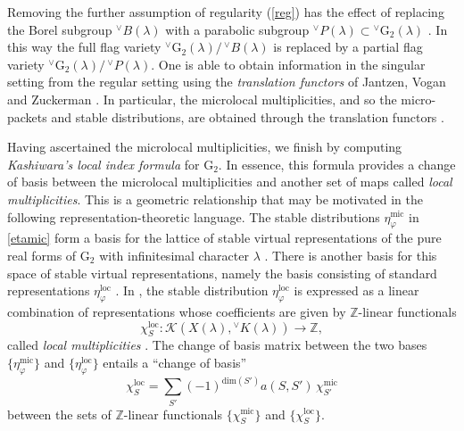 \documentclass[a4paper, 11pt]{article}
\begin{document}
Removing the further assumption of regularity (\ref{reg}) has the effect of
replacing the 
Borel subgroup ${^\vee}B(\lambda)$ with a parabolic subgroup
${^\vee}P(\lambda) \subset {^\vee}\mathrm{G}_{2}(\lambda)$
\cite[(6.2)(e), Proposition 6.16]{ABV}.   In this way the full flag
variety ${^\vee}\mathrm{G}_{2}(\lambda)/ \, {^\vee}B(\lambda)$ is
replaced by a partial flag variety ${^\vee}\mathrm{G}_{2}(\lambda)/ \,
{^\vee}P(\lambda)$.  One is able to obtain information in the singular
setting from the regular setting using the \emph{translation functors}
of Jantzen, Vogan and Zuckerman \cite[Propositions 8.8 and 16.6]{ABV}.
In particular, the microlocal multiplicities, and so the micro-packets
and stable distributions, are obtained through the translation functors
\cite[Proposition 20.1 (e)]{ABV}.  

Having ascertained the microlocal multiplicities,
we finish by computing  \emph{Kashiwara's local index formula} for
$\mathrm{G}_{2}$.  In essence, this formula provides a change of basis
between the microlocal multiplicities and another set of maps called
\emph{local multiplicities}.  This is a geometric relationship that may be
motivated in the following representation-theoretic language.
The stable distributions $\eta_{\varphi}^{\mathrm{mic}}$ in
\eqref{etamic} form a basis for the 
lattice of stable virtual representations  
of the pure real forms of $\mathrm{G}_2$ with infinitesimal
character $\lambda$ \cite[Corollary 19.16]{ABV}.
There is another basis for this space of stable virtual
representations, namely the basis consisting of  standard representations
$\eta_\varphi^{\mathrm{loc}}$  
\cite[Definition~18.9, Lemma 18.11]{ABV}.  
In \cite[Lemma~18.15]{ABV}, the stable distribution
$\eta_{\varphi}^{\mathrm{loc}}$ is expressed as a linear combination of
representations whose coefficients are given by $\mathbb{Z}$-linear
functionals
$$\chi_{S}^{\mathrm{loc}} : 
  \mathscr{K}(X(\lambda),{}^{\vee}K(\lambda)) \longrightarrow \mathbb{Z},$$
called \emph{local multiplicities} \cite[Definition~1.28]{ABV}.   
The change of basis matrix between the two bases
$\{\eta_{\varphi}^{\mathrm{mic}}\}$ and 
$\{\eta_{\varphi}^{\mathrm{loc}}\}$ entails a ``change of basis''
\begin{equation}
\label{Kashiwaraformula}
\chi_{S}^{\mathrm{loc}} = \sum_{S'} (-1)^{\mathrm{dim}(S')} a(S,
S') \, \chi_{S'}^{\mathrm{mic}} 
\end{equation}
between the sets of $\mathbb{Z}$-linear functionals $\{
\chi_{S}^{\mathrm{mic}}\}$ and $\{\chi_{S}^{\mathrm{loc}}\}$.
\end{document}
